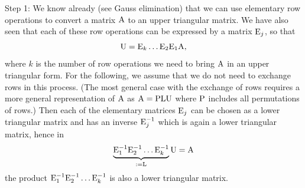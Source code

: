 \documentclass[
  a4paper,
  DIV=11,
  numbers=noendperiod,
  oneside]{scrreprt}
\theoremstyle{definition}
\theoremstyle{remark}
\begin{document}
Step 1: We know already (see Gauss elimination) that we can use
elementary row operations to convert a matrix \({\rm A}\) to an upper
triangular matrix. We have also seen that each of these row operations
can be expressed by a matrix \({\rm E}_{j}\), so that
\[{\rm U} =  {\rm E}_{k} \ldots {\rm E}_{2} {\rm E}_{1} {\rm A} ,\]
where \(k\) is the number of row operations we need to bring \({\rm A}\)
in an upper triangular form. For the following, we assume that we do not
need to exchange rows in this process. (The most general case with the
exchange of rows requires a more general representation of \({\rm A}\)
as \({\rm A}= {\rm PLU}\) where \({\rm P}\) includes all permutations of
rows.) Then each of the elementary matrices \({\rm E}_{j}\) can be
chosen as a lower triangular matrix and has an inverse
\({\rm E}_{j}^{-1}\) which is again a lower triangular matrix, hence in
\[\underbrace{{\rm E}_{1}^{-1}  {\rm E}_{2}^{-1}\ldots {\rm E}_{k}^{-1}}_{:={\rm L}} {\rm U} =   {\rm A}\]
the product
\({\rm E}_{1}^{-1}  {\rm E}_{2}^{- 1}\ldots {\rm E}_{k}^{-1}\) is also a
lower triangular matrix.
\end{document}
